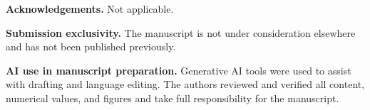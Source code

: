 \documentclass[pdflatex,sn-mathphys-num,iicol]{sn-jnl}
\begin{document}
\noindent\textbf{Acknowledgements.} Not applicable.

\noindent\textbf{Submission exclusivity.} The manuscript is not under consideration elsewhere and has not been published previously.

\noindent\textbf{AI use in manuscript preparation.} Generative AI tools were used to assist with drafting and language editing. The authors reviewed and verified all content, numerical values, and figures and take full responsibility for the manuscript.


\end{document}
